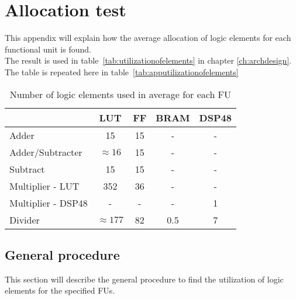 \chapter{Allocation test}\label{app:alloctest}
This appendix will explain how the average allocation of logic elements for each functional unit is found.\\
The result is used in table~\vref{tab:utilizationofelements} in chapter \ref{ch:archdesign}. The table is repeated here in table~\vref{tab:apputilizationofelements}

\begin{table}[ht!]
\centering
\begin{tabular}{l | c c c c }
  \toprule
   &  LUT & FF & BRAM & DSP48 \\
  \midrule
  Adder & 15 & 15 & - & - \\
  Adder/Subtracter  & $\approx 16$ &  15 & - & - \\
  Subtract  & 15 &  15 & - & - \\
  Multiplier - LUT  & 352 &  36 & - & - \\
  Multiplier - DSP48 & - & - & - & 1 \\
  Divider & $\approx 177$ & 82 & 0.5 & 7 \\
  \bottomrule
\end{tabular}
\caption{Number of logic elements used in average for each FU}
\label{tab:apputilizationofelements}
\end{table}

\section{General procedure}
This section will describe the general procedure to find the utilization of logic elements for the specified FUs. 

